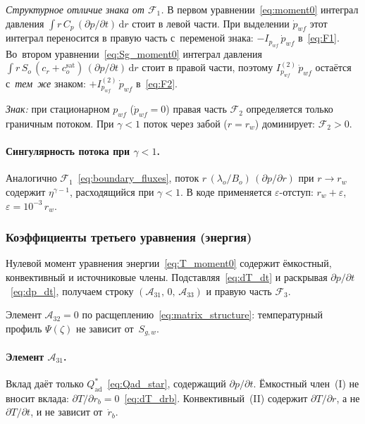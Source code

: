\documentclass[12pt,a4paper]{article}
\newcommand{\dd}{\mathrm{d}}
\newcommand{\pp}{\partial}
\newcommand{\sat}{\mathrm{sat}}
\begin{document}
\emph{Структурное отличие знака от $\mathcal{F}_1$.}
В первом уравнении~\eqref{eq:moment0} интеграл давления
$\int r\,C_p\,(\pp p/\pp t)\,\dd r$ стоит в левой части.
При выделении $\dot{p}_{wf}$ этот интеграл переносится
в правую часть с~переменой знака: $-I_{p_{wf}}\,\dot{p}_{wf}$
в~\eqref{eq:F1}. Во~втором уравнении~\eqref{eq:Sg_moment0}
интеграл давления $\int r\,S_o\,(c_r+c_o^\sat)\,(\pp p/\pp t)
\,\dd r$ стоит в правой части, поэтому
$I_{p_{wf}}^{(2)}\,\dot{p}_{wf}$ остаётся с~\emph{тем~же}
знаком: $+I_{p_{wf}}^{(2)}\,\dot{p}_{wf}$ в~\eqref{eq:F2}.

\emph{Знак:} при стационарном $p_{wf}$ ($\dot{p}_{wf} = 0$)
правая часть $\mathcal{F}_2$ определяется только граничным
потоком. При $\gamma < 1$ поток через забой ($r = r_w$)
доминирует: $\mathcal{F}_2 > 0$.

\paragraph{Сингулярность потока при $\gamma < 1$.}
Аналогично $\mathcal{F}_1$~\eqref{eq:boundary_fluxes},
поток $r\,(\lambda_o/B_o)\,(\pp p/\pp r)$ при $r \to r_w$
содержит $\eta^{\gamma-1}$, расходящийся при $\gamma < 1$.
В коде применяется $\varepsilon$-отступ:
$r_w + \varepsilon$, $\varepsilon = 10^{-3}\,r_w$.


\subsubsection{Коэффициенты третьего уравнения (энергия)}

Нулевой момент уравнения энергии~\eqref{eq:T_moment0}
содержит ёмкостный, конвективный и источниковые члены.
Подставляя~\eqref{eq:dT_dt} и раскрывая
$\partial p/\partial t$~\eqref{eq:dp_dt},
получаем строку $(\mathcal{A}_{31},\, 0,\, \mathcal{A}_{33})$
и правую часть $\mathcal{F}_3$.

Элемент $\mathcal{A}_{32} = 0$ по расщеплению~\eqref{eq:matrix_structure}:
температурный профиль $\Psi(\zeta)$ не зависит от~$S_{g,w}$.

\paragraph{Элемент $\mathcal{A}_{31}$.}

Вклад даёт только $Q_{\text{ad}}^*$~\eqref{eq:Qad_star},
содержащий $\partial p/\partial t$.
Ёмкостный член~(I) не вносит вклада:
$\partial T/\partial r_b = 0$~\eqref{eq:dT_drb}.
Конвективный~(II) содержит $\partial T/\partial r$, а не
$\partial T/\partial t$, и не зависит от~$\dot{r}_b$.
\end{document}
